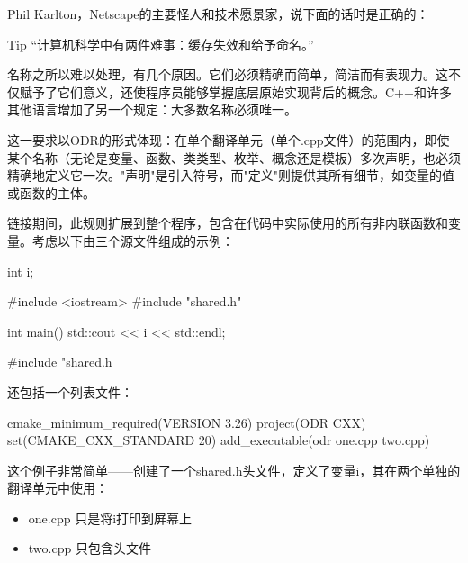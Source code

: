 
Phil Karlton，Netscape的主要怪人和技术愿景家，说下面的话时是正确的：

\begin{myTip}{Tip}
 “计算机科学中有两件难事：缓存失效和给予命名。”
\end{myTip}

名称之所以难以处理，有几个原因。它们必须精确而简单，简洁而有表现力。这不仅赋予了它们意义，还使程序员能够掌握底层原始实现背后的概念。C++和许多其他语言增加了另一个规定：大多数名称必须唯一。

这一要求以ODR的形式体现：在单个翻译单元（单个.cpp文件）的范围内，即使某个名称（无论是变量、函数、类类型、枚举、概念还是模板）多次声明，也必须精确地定义它一次。"声明"是引入符号，而"定义"则提供其所有细节，如变量的值或函数的主体。

链接期间，此规则扩展到整个程序，包含在代码中实际使用的所有非内联函数和变量。考虑以下由三个源文件组成的示例：


\begin{cpp}
int i;
\end{cpp}


\begin{cpp}
#include <iostream>
#include "shared.h"

int main() {
    std::cout << i << std::endl;
}
\end{cpp}


\begin{cpp}
#include "shared.h
\end{cpp}

还包括一个列表文件：


\begin{cmake}
cmake_minimum_required(VERSION 3.26)
project(ODR CXX)
set(CMAKE_CXX_STANDARD 20)
add_executable(odr one.cpp two.cpp)
\end{cmake}

这个例子非常简单——创建了一个shared.h头文件，定义了变量i，其在两个单独的翻译单元中使用：

\begin{itemize}
\item
one.cpp 只是将i打印到屏幕上

\item
two.cpp 只包含头文件
\end{itemize}

